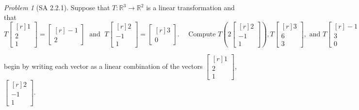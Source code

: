 \documentclass[fleqn,11pt]{paper}
\theoremstyle{remark}
\newtheorem{problem}{Problem}
\newtheorem*{solution}{{\bf Solution}}
\newcommand\R{\fld{R}}
\newcommand{\<}{\ensuremath{\langle}}
\renewcommand{\>}{\ensuremath{\rangle}}
\newcommand\fld[1]{\ensuremath{\mathbb{#1}}}
\begin{document}
\begin{problem}[SA 2.2.1]
  Suppose that $T : \R^3 \to \R^2$ is a linear transformation and that
  \[
  T\begin{bmatrix*}[r] 1 \\ 2 \\ 1 \end{bmatrix*}= \begin{bmatrix*}[r] -1 \\ 2\end{bmatrix*}
    \; \text{ and } \;
    T\begin{bmatrix*}[r] 2 \\ -1 \\ 1 \end{bmatrix*}= \begin{bmatrix*}[r] 3 \\ 0\end{bmatrix*}.
\quad
      \text{ Compute }
      T\left(2\begin{bmatrix*}[r] 2 \\ -1 \\ 1 \end{bmatrix*}\right),
      T\begin{bmatrix*}[r] 3 \\ 6 \\ 3 \end{bmatrix*}, \text{ and  }
      T\begin{bmatrix*}[r] -1 \\ 3 \\ 0 \end{bmatrix*}.\]


       begin by writing each vector as a linear combination of 
      the vectors 
      $\begin{bmatrix*}[r] 1 \\ 2 \\ 1 \end{bmatrix*}$,
      $\begin{bmatrix*}[r] 2 \\ -1 \\ 1 \end{bmatrix*}$.
\end{problem}
\newpage
\end{document}
